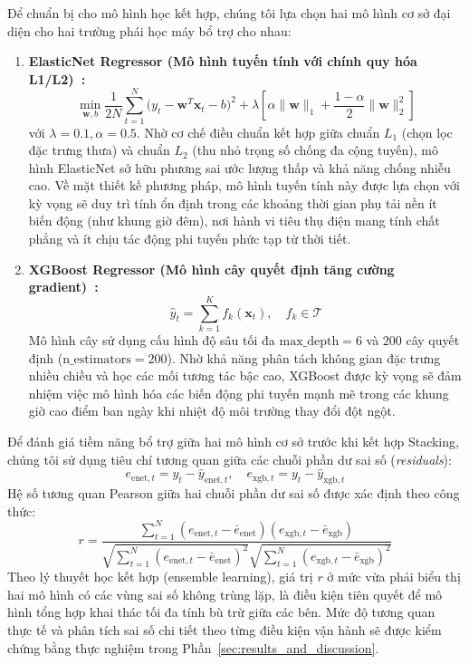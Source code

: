 Để chuẩn bị cho mô hình học kết hợp, chúng tôi lựa chọn hai mô hình cơ sở đại diện cho hai trường phái học máy bổ trợ cho nhau:
\begin{enumerate}
    \item \textbf{ElasticNet Regressor (Mô hình tuyến tính với chính quy hóa L1/L2)~\cite{zou2005regularization}:}
    \begin{equation}
        \min_{\mathbf{w}, b} \frac{1}{2N} \sum_{t=1}^N \Big(y_t - \mathbf{w}^T \mathbf{x}_t - b\Big)^2 + \lambda \left[ \alpha \|\mathbf{w}\|_1 + \frac{1 - \alpha}{2} \|\mathbf{w}\|_2^2 \right]
    \end{equation}
    với $\lambda = 0.1, \alpha = 0.5$. Nhờ cơ chế điều chuẩn kết hợp giữa chuẩn $L_1$ (chọn lọc đặc trưng thưa) và chuẩn $L_2$ (thu nhỏ trọng số chống đa cộng tuyến), mô hình ElasticNet sở hữu phương sai ước lượng thấp và khả năng chống nhiễu cao. Về mặt thiết kế phương pháp, mô hình tuyến tính này được lựa chọn với kỳ vọng sẽ duy trì tính ổn định trong các khoảng thời gian phụ tải nền ít biến động (như khung giờ đêm), nơi hành vi tiêu thụ điện mang tính chất phẳng và ít chịu tác động phi tuyến phức tạp từ thời tiết.
    \item \textbf{XGBoost Regressor (Mô hình cây quyết định tăng cường gradient)~\cite{chen2016xgboost}:}
    \begin{equation}
        \hat{y}_t = \sum_{k=1}^K f_k(\mathbf{x}_t), \quad f_k \in \mathcal{T}
    \end{equation}
    Mô hình cây sử dụng cấu hình độ sâu tối đa $\text{max\_depth} = 6$ và $200$ cây quyết định ($\text{n\_estimators} = 200$). Nhờ khả năng phân tách không gian đặc trưng nhiều chiều và học các mối tương tác bậc cao, XGBoost được kỳ vọng sẽ đảm nhiệm việc mô hình hóa các biến động phi tuyến mạnh mẽ trong các khung giờ cao điểm ban ngày khi nhiệt độ môi trường thay đổi đột ngột.
\end{enumerate}

Để đánh giá tiềm năng bổ trợ giữa hai mô hình cơ sở trước khi kết hợp Stacking, chúng tôi sử dụng tiêu chí tương quan giữa các chuỗi phần dư sai số (\textit{residuals}):
\begin{equation}
    e_{\text{enet}, t} = y_t - \hat{y}_{\text{enet}, t}, \quad e_{\text{xgb}, t} = y_t - \hat{y}_{\text{xgb}, t}
\end{equation}
Hệ số tương quan Pearson giữa hai chuỗi phần dư sai số được xác định theo công thức:
\begin{equation}
    r = \frac{\sum_{t=1}^N (e_{\text{enet}, t} - \bar{e}_{\text{enet}})(e_{\text{xgb}, t} - \bar{e}_{\text{xgb}})}{\sqrt{\sum_{t=1}^N (e_{\text{enet}, t} - \bar{e}_{\text{enet}})^2} \sqrt{\sum_{t=1}^N (e_{\text{xgb}, t} - \bar{e}_{\text{xgb}})^2}}
\end{equation}
Theo lý thuyết học kết hợp (ensemble learning), giá trị $r$ ở mức vừa phải biểu thị hai mô hình có các vùng sai số không trùng lặp, là điều kiện tiên quyết để mô hình tổng hợp khai thác tối đa tính bù trừ giữa các bên. Mức độ tương quan thực tế và phân tích sai số chi tiết theo từng điều kiện vận hành sẽ được kiểm chứng bằng thực nghiệm trong Phần~\ref{sec:results_and_discussion}.

